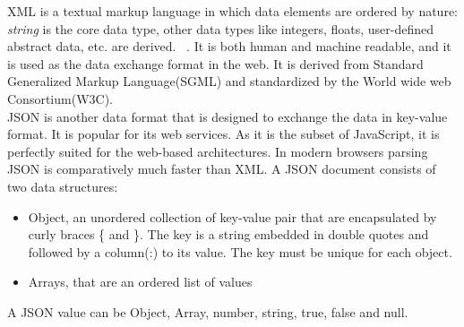 XML is a textual markup language in which data elements are ordered by nature: \textit{string} is the core data type, other data types like integers, floats, user-defined abstract data, etc. are derived. ~\citep{xmark/original}. It is both human and machine readable, and it is used as the data exchange format in the web. It is derived from Standard Generalized Markup Language(SGML) and standardized by the World wide web Consortium(W3C).
\\
    JSON is another data format that is designed to exchange the data in key-value format. It is popular for its web services. As it is the subset of JavaScript, it is perfectly suited for the web-based architectures. In modern browsers parsing JSON is comparatively much faster than XML. A JSON document consists of two data structures:
\begin{itemize}
	\item Object, an unordered collection of key-value pair that are encapsulated by curly braces \{ and \}. The key is a string embedded in double quotes and followed by a column(:) to its value. The key must be unique for each object.
	\item Arrays, that are an ordered list of values
\end{itemize}
A JSON value can be Object, Array, number, string, true, false and null.
  

